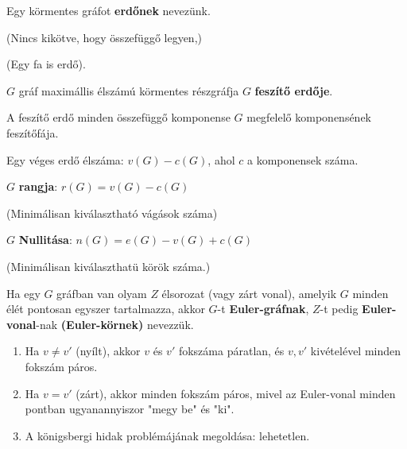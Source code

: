 \documentclass[10pt]{article}
\renewcommand{\\}{\par\noindent}
\begin{document}
\begin{frame}
\begin{tcolorbox}[title={Erdő, Feszítő erdő}]
Egy körmentes gráfot \textbf{erdőnek} nevezünk.\\
(Nincs kikötve, hogy összefüggő legyen,)\\
(Egy fa is erdő).\\
\medskip
$G$ gráf maximállis élszámú körmentes részgráfja $G$ \textbf{feszítő erdője}.
\end{tcolorbox}

\begin{tcolorbox}[title={Ész}]
A feszítő erdő minden összefüggő komponense $G$ megfelelő komponensének feszítőfája.\\
\medskip
Egy véges erdő élszáma: $v(G) - c(G)$, ahol $c$ a komponensek száma.
\end{tcolorbox}

\begin{tcolorbox}[title={Rang, Nullitás}]
$G$ \textbf{rangja}: $r(G) = v(G) - c(G)$\\
(Minimálisan kiválasztható vágások száma)\\
\medskip
$G$ \textbf{Nullitása}: $n(G) = e(G) - v(G) + c(G)$\\
(Minimálisan kiválaszthatü körök száma.)
\end{tcolorbox}
\end{frame}

\begin{frame}
\begin{tcolorbox}[title={Def.: Euler gráfok}]
Ha egy $G$ gráfban van olyam $Z$ élsorozat (vagy zárt vonal), amelyik $G$ minden élét pontosan egyszer tartalmazza, akkor $G$-t \textbf{Euler-gráfnak}, $Z$-t pedig \textbf{Euler-vonal}-nak \textbf{(Euler-körnek)} nevezzük.
\end{tcolorbox}
\begin{tcolorbox}[title={Ész}]
\begin{enumerate}
\item Ha $v \neq v'$ (nyílt), akkor $v$ és $v'$ fokszáma páratlan, és $v, v'$ kivételével minden fokszám páros.
\item Ha $v = v'$ (zárt), akkor minden fokszám páros, mivel az Euler-vonal minden pontban ugyanannyiszor "megy be" és "ki".
\item A königsbergi hidak problémájának megoldása: lehetetlen.
\end{enumerate}
\end{tcolorbox}
\end{frame}
\end{document}
